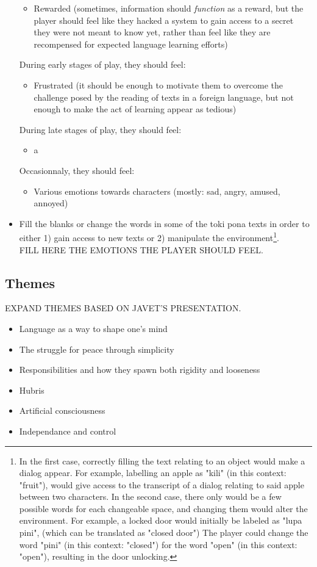\documentclass{scrartcl}
\begin{document}
\begin{itemize}
\begin{itemize}
					\item Rewarded (sometimes, information should \textit{function} as a reward, but the player should feel like they hacked a system to gain access to a secret they were not meant to know yet, rather than feel like they are recompensed for expected language learning efforts)
				\end{itemize}
				During early stages of play, they should feel: 
				\begin{itemize}
					\item Frustrated (it should be enough to motivate them to overcome the challenge posed by the reading of texts in a foreign language, but not enough to make the act of learning appear as tedious)
				\end{itemize}
				During late stages of play, they should feel:
				\begin{itemize}
					\item a
				\end{itemize}
				Occasionnaly, they should feel:
				\begin{itemize}
					\item Various emotions towards characters (mostly: sad, angry, amused, annoyed)
				\end{itemize}
				\item Fill the blanks or change the words in some of the toki pona texts in order to either 1) gain access to new texts or 2) manipulate the environment\footnote{In the first case, correctly filling the text relating to an object would make a dialog appear. For example, labelling an apple as "kili" (in this context: "fruit"), would give access to the transcript of a dialog relating to said apple between two characters. In the second case, there only would be a few possible words for each changeable space, and changing them would alter the environment. For example, a locked door would initially be labeled as "lupa pini", (which can be translated as "closed door") The player could change the word "pini" (in this context: "closed") for the word "open" (in this context: "open"), resulting in the door unlocking.}.\\
				FILL HERE THE EMOTIONS THE PLAYER SHOULD FEEL.
			\end{itemize}
		\subsection{Themes}
		EXPAND THEMES BASED ON JAVET'S PRESENTATION.
		\begin{itemize}
			\item Language as a way to shape one's mind
			\item The struggle for peace through simplicity
			\item Responsibilities and how they spawn both rigidity and looseness
			\item Hubris
			\item Artificial consciousness
			\item Independance and control
		\end{itemize}
\end{document}
